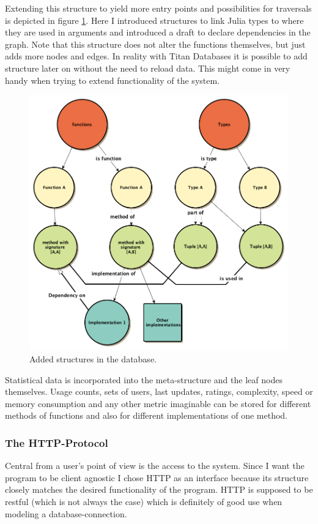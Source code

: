 \documentclass[twoside, 11pt]{scrartcl}
\begin{document}
Extending this structure to yield more entry points and possibilities for traversals is depicted in figure \ref{fig:dbStructure2}. Here I introduced structures to link Julia types to where they are used in arguments and introduced a draft to declare dependencies in the graph. Note that this structure does not alter the functions themselves, but just adds more nodes and edges. In reality with Titan Databases it is possible to add structure later on without the need to reload data. This might come in very handy when trying to extend functionality of the system.

\begin{figure}[h!]		
 	\includegraphics[scale=0.4]{figures/dbStructure2.png}
	\caption{Added structures in the database.}
	\label{fig:dbStructure2}
\end{figure}

Statistical data is incorporated into the meta-structure and the leaf nodes themselves. Usage counts, sets of users, last updates, ratings, complexity, speed or memory consumption and any other metric imaginable can be stored for different methods of functions and also for different implementations of one method.

\subsubsection{The HTTP-Protocol}
Central from a user's point of view is the access to the system. Since I want the program to be client agnostic I chose HTTP as an interface because its structure closely matches the desired functionality of the program. HTTP is supposed to be restful (which is not always the case) which is definitely of good use when modeling a database-connection.
\end{document}
